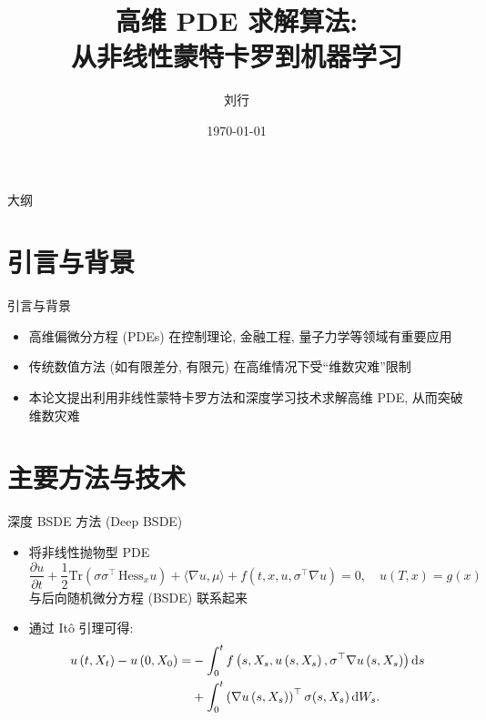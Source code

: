 \documentclass[aspectratio=169]{beamer}
\title{高维 PDE 求解算法:\\从非线性蒙特卡罗到机器学习}
\author{刘行}
\date{\today}
\def\dif{\mathinner{\mathrm{d}}\hphantom{\mskip-\thinmuskip}}
\begin{document}
	\begin{frame}
		\titlepage
	\end{frame}

	\begin{frame}{大纲}
		\tableofcontents
	\end{frame}

	\section{引言与背景}
	\begin{frame}{引言与背景}
		\begin{itemize}
			\item 高维偏微分方程 (PDEs) 在控制理论, 金融工程, 量子力学等领域有重要应用
			\item 传统数值方法 (如有限差分, 有限元) 在高维情况下受``维数灾难''限制
			\item 本论文提出利用非线性蒙特卡罗方法和深度学习技术求解高维 PDE, 从而突破维数灾难
		\end{itemize}
	\end{frame}

	\section{主要方法与技术}
	\begin{frame}{深度 BSDE 方法 (Deep BSDE)}
		\begin{itemize}
			\item 将非线性抛物型 PDE
				\begin{equation*}
					\frac{\partial u}{\partial t} + \frac{1}{2} \mathrm{Tr}\left(\sigma\sigma^{\top}\,\mathrm{Hess}_x u\right) + \langle\nabla u, \mu\rangle + f\left(t, x, u, \sigma^{\top} \nabla u\right)=0, \quad u\left(T,x\right)=g\left(x\right)
				\end{equation*}
				与后向随机微分方程 (BSDE) 联系起来
			\item 通过 It\^{o} 引理可得:
				\begin{equation*}
					\begin{aligned}
						u\left(t, X_{t}\right) - u\left(0, X_{0}\right) = &-\int_{0}^{t} f\left(s, X_{s}, u\left(s, X_s\right), \sigma^{\top}\nabla u\left(s, X_{s}\right)\right) \dif s \\
						&+ \int_{0}^{t} \left(\nabla u\left(s, X_{s}\right)\right)^{\top}\sigma(s, X_{s}) \dif W_{s}.
					\end{aligned}
				\end{equation*}
		\end{itemize}
	\end{frame}
\end{document}

